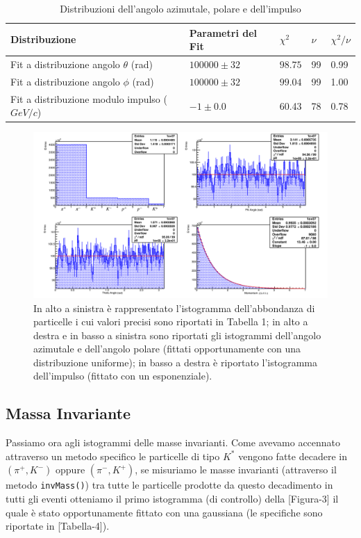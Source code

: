 \documentclass[a4paper,10 pt]{article}
\begin{document}
\begin{table}[h]
    \centering
    \begin{tabular}{|l|l|l|l|l|}
    \hline
    {\bf Distribuzione} & {\bf Parametri del Fit} & $\chi^2$ & $\nu$ & $\chi^2/\nu$ \\ \hline
    Fit a distribuzione angolo $\theta$ (rad) & $100000 \pm 32$ & $98.75$ & 99 & 0.99 \\ \hline
    Fit a distribuzione angolo $\phi$ (rad) & $100000 \pm 32$ &  $99.04$ & 99 & 1.00  \\ \hline
    Fit a distribuzione modulo impulso ($GeV/c$) & $-1 \pm 0.0$ & 60.43 & 78 &  0.78\\ \hline
    \end{tabular}
    \caption{Distribuzioni dell'angolo azimutale, polare e dell'impulso}
\end{table}

\begin{figure}[h]
    \centering
    \includegraphics[scale=0.25]{c1.pdf}
    \caption{In alto a sinistra è rappresentato l'istogramma dell'abbondanza di particelle i cui valori
    precisi sono riportati in Tabella 1; in alto a destra e in basso a sinistra sono riportati gli 
    istogrammi dell'angolo azimutale e dell'angolo polare (fittati opportunamente con una distribuzione uniforme); in basso a destra è riportato l'istogramma
    dell'impulso (fittato con un esponenziale).}
\end{figure}

\subsection{Massa Invariante}
Passiamo ora agli istogrammi delle masse invarianti. Come avevamo accennato attraverso un metodo specifico le
particelle di tipo $K^*$ vengono fatte decadere in $(\pi^+, K^-)$ oppure $(\pi^-, K^+)$, se misuriamo le 
masse invarianti (attraverso il metodo \verb!invMass()!) tra tutte le particelle prodotte da questo decadimento 
in tutti gli eventi otteniamo il primo istogramma (di controllo) della [Figura-3] il quale è stato opportunamente fittato con una
gaussiana (le specifiche sono riportate in [Tabella-4]). 
\end{document}
